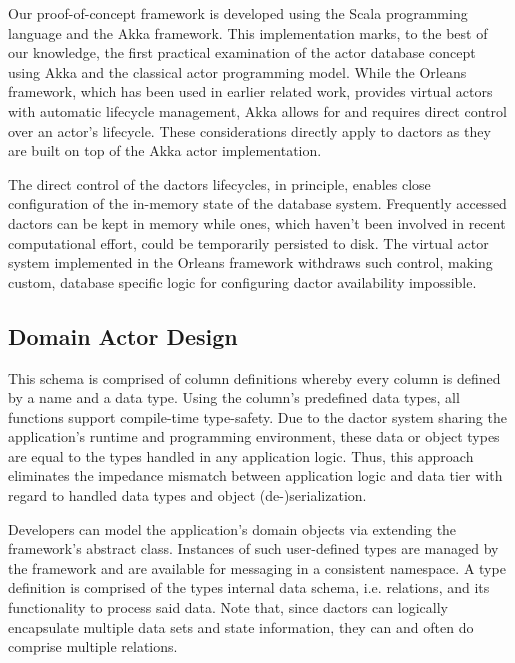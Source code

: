 Our proof-of-concept framework is developed using the Scala programming language and the Akka framework.
This implementation marks, to the best of our knowledge, the first practical examination of the actor database concept using Akka and the classical actor programming model.
While the Orleans framework, which has been used in earlier related work, provides virtual actors with automatic lifecycle management, Akka allows for and requires direct control over an actor's lifecycle.
These considerations directly apply to \glspl{dactor} as they are built on top of the Akka actor implementation.

The direct control of the \glspl{dactor} lifecycles, in principle, enables close configuration of the in-memory state of the database system.
Frequently accessed \glspl{dactor} can be kept in memory while ones, which haven't been involved in recent computational effort, could be temporarily persisted to disk.
The virtual actor system implemented in the Orleans framework withdraws such control, making custom, database specific logic for configuring \gls{dactor} availability impossible.


\subsection{Domain Actor Design}\label{subsec:domain_actor_design}

This schema is comprised of column definitions whereby every column is defined by a name and a data type.
Using the column's predefined data types, all functions support compile-time type-safety.
Due to the \gls{dactor} system sharing the application's runtime and programming environment, these data or object types are equal to the types handled in any application logic.
Thus, this approach eliminates the impedance mismatch between application logic and data tier with regard to handled data types and object (de-)serialization.

Developers can model the application's domain objects via extending the framework's abstract  class.
Instances of such user-defined  types are managed by the framework and are available for messaging in a consistent namespace.
A  type definition is comprised of the types internal data schema, i.e. \glspl{relation}, and its functionality to process said data.
Note that, since \glspl{dactor} can logically encapsulate multiple data sets and state information, they can and often do comprise multiple \glspl{relation}.

